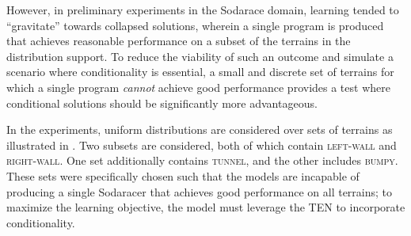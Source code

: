 \documentclass{article}
\begin{document}
However, in preliminary experiments in the Sodarace domain, learning tended to ``gravitate'' towards collapsed solutions, wherein a single program is produced that achieves reasonable performance on a subset of the terrains in the distribution support. To reduce the viability of such an outcome and simulate a scenario where conditionality is essential, a small and discrete set of terrains for which a single program \emph{cannot} achieve good performance provides a test where conditional solutions should be significantly more advantageous. 


In the experiments, uniform distributions are considered over sets of terrains as illustrated in . Two subsets are considered, both of which contain \textsc{left-wall} and \textsc{right-wall}. One set additionally contains \textsc{tunnel}, and the other includes \textsc{bumpy}. These sets were specifically chosen such that the models are incapable of producing a single Sodaracer that achieves good performance on all terrains; to maximize the learning objective, the model must leverage the TEN to incorporate conditionality. %
\end{document}
